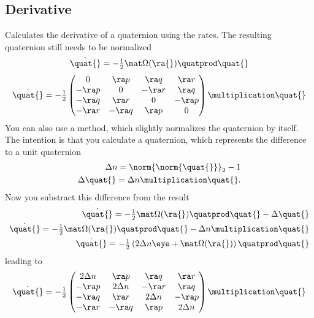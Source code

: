 \subsection*{Derivative}
Calculates the derivative of a quaternion using the rates. The resulting quaternion still needs to be normalized
\begin{equation}
\dot{\quat{}} = -\tfrac 1 2 \mat \Omega(\ra{}) \quatprod \quat{}
\end{equation}
\begin{equation}
\dot{\quat{}} = -\tfrac 1 2 \begin{pmatrix} 
  0		&  \ra p &  \ra q &  \ra r	\\
-\ra p	&	0	 & -\ra r &  \ra q	\\
-\ra q	&  \ra r &	0	  & -\ra p	\\
-\ra r	& -\ra q &  \ra p &		0
\end{pmatrix}
\multiplication \quat{}
\end{equation}
You can also use a method, which slightly normalizes the quaternion by itself. The intention is that you calculate a quaternion, which represents the difference to a unit quaternion
\begin{eqnarray}
\Delta n = \norm{\norm{\quat{}}}_2-1 \\
\Delta \quat {} = \Delta n \multiplication \quat{}.
\end{eqnarray}
Now you substract this difference from the result
\begin{eqnarray}
\dot{\quat{}} = -\tfrac 1 2 \mat \Omega(\ra{}) \quatprod \quat{} - \Delta \quat {} \\
\dot{\quat{}} = -\tfrac 1 2 \mat \Omega(\ra{}) \quatprod \quat{} - \Delta n \multiplication \quat{} \\
\dot{\quat{}} = -\tfrac 1 2 \left( 2 \Delta n \eye + \mat \Omega(\ra{}) \right) \quatprod \quat{}
\end{eqnarray}
leading to
\begin{equation}
\dot{\quat{}} = -\tfrac 1 2 \begin{pmatrix} 
2 \Delta n&  \ra p &  \ra q &  \ra r	\\
-\ra p	&2 \Delta n& -\ra r &  \ra q	\\
-\ra q	&  \ra r &2 \Delta n & -\ra p	\\
-\ra r	& -\ra q &  \ra p &2 \Delta n
\end{pmatrix}
\multiplication \quat{}
\end{equation}
